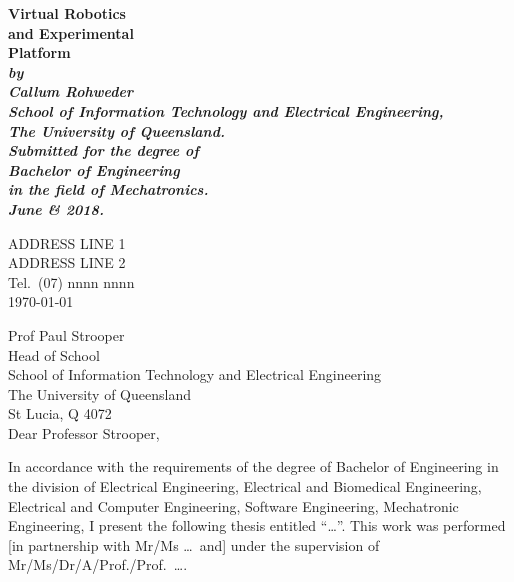 \documentclass[12pt,openany,a4paper]{book}
\renewcommand{\baselinestretch}{1.2}	%
\begin{document}
\frontmatter

\begin{titlepage}
\renewcommand{\baselinestretch}{1.0}
\begin{center}
\vspace*{35mm}
\Huge\bf
		Virtual Robotics\\
		and Experimental\\
		Platform\\
\vspace{20mm}
\large\sl
		by\\
		Callum Rohweder
		\medskip\\
\rm
		School of Information Technology and Electrical Engineering,\\
		The University of Queensland.\\
\vspace{30mm}
		Submitted for the degree of\\
		Bachelor of Engineering
		\smallskip\\
\normalsize
		in the field of Mechatronics.
		\medskip\\
\large
		June \& 2018.		
\end{center}
\end{titlepage}

\cleardoublepage

\begin{flushright}
	ADDRESS LINE 1\\
	ADDRESS LINE 2\\
	Tel.\ (07) nnnn nnnn\\
	\medskip
	\today
\end{flushright}
\begin{flushleft}
  Prof Paul Strooper\\
  Head of School\\
  School of Information Technology and Electrical Engineering\\
  The University of Queensland\\
  St Lucia, Q 4072\\
  \bigskip\bigskip
  Dear Professor Strooper,
\end{flushleft}

In accordance with the requirements of the degree of Bachelor of
Engineering in the division of 
Electrical Engineering,
Electrical and Biomedical Engineering,
Electrical and Computer Engineering,
Software Engineering,
Mechatronic Engineering,
I present the
following thesis entitled ``\ldots''.  This work was performed [in
partnership with Mr/Ms \ldots\ and] under the supervision of
Mr/Ms/Dr/A/Prof./Prof.~\ldots.
\end{document}
